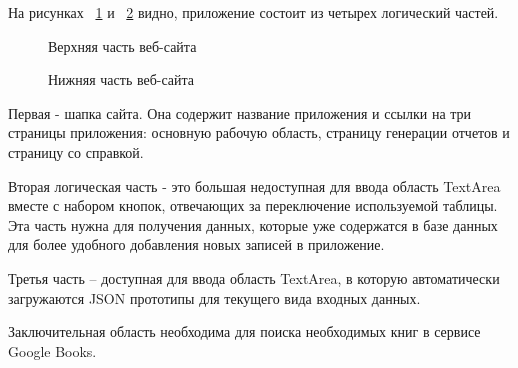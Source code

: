 На рисунках ~\ref{ris:web_example_1} и ~\ref{ris:web_example_2} видно, приложение состоит из четырех логический частей. 

\begin{figure}[h!]
    \caption{Верхняя часть веб-сайта}
    \label{ris:web_example_1}
\end{figure}

\begin{figure}[h!]
    \caption{Нижняя часть веб-сайта}
    \label{ris:web_example_2}
\end{figure}

Первая - шапка сайта. Она содержит название 
приложения и ссылки на три страницы приложения: основную рабочую область, страницу генерации отчетов и страницу со 
справкой.

Вторая логическая часть - это большая недоступная для ввода область TextArea вместе с набором кнопок, 
отвечающих за переключение используемой таблицы. Эта часть нужна для получения данных, которые 
уже содержатся в базе данных для более удобного добавления новых записей в приложение.

Третья часть -- доступная для ввода область TextArea, в которую автоматически загружаются
JSON прототипы для текущего вида входных данных.

Заключительная область необходима для поиска необходимых книг в сервисе Google Books.
